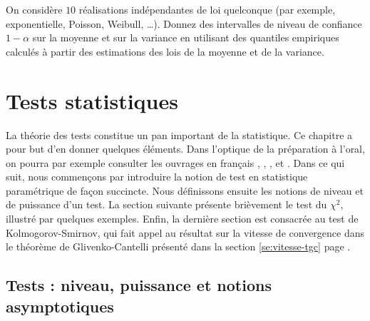 \begin{exo}
  On considère $10$ réalisations indépendantes de loi quelconque (par exemple,
  exponentielle, Poisson, Weibull, \ldots). Donnez des intervalles de niveau
  de confiance $1-\alpha$ sur la moyenne et sur la variance en utilisant des
  quantiles empiriques calculés à partir des estimations des lois de la
  moyenne et de la variance.
\end{exo}

%
\section{Tests statistiques}\label{se:tests}
%


La théorie des tests constitue un pan important de la statistique. Ce chapitre
a pour but d'en donner quelques éléments. Dans l'optique de la préparation à
l'oral, on pourra par exemple consulter les ouvrages en français \cite{vokac},
\cite{dacunha-castelle-duflo}, \cite{paul-toulouse}, \cite{saporta} et
\cite{tomassone}. Dans ce qui suit, nous commençons par introduire la notion
de test en statistique paramétrique de façon succincte. Nous définissons
ensuite les notions de niveau et de puissance d'un test. La section suivante
présente brièvement le test du $\chi^2$, illustré par quelques exemples.
Enfin, la dernière section est consacrée au test de Kolmogorov-Smirnov, qui
fait appel au résultat sur la vitesse de convergence dans le théorème de
Glivenko-Cantelli présenté dans la section \ref{se:vitesse-tgc} page
\pageref{se:vitesse-tgc}.

%
\subsection{Tests : niveau, puissance et notions asymptotiques}
%

